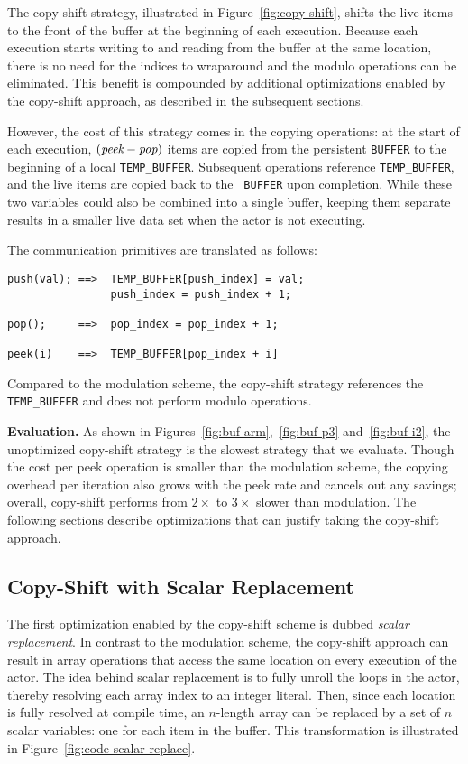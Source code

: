 The copy-shift strategy, illustrated in Figure~\ref{fig:copy-shift},
shifts the live items to the front of the buffer at the beginning of
each execution.  Because each execution starts writing to and reading from
the buffer at the same location, there is no need for the indices to
wraparound and the modulo operations can be eliminated.  This benefit
is compounded by additional optimizations enabled by the copy-shift
approach, as described in the subsequent sections.

However, the cost of this strategy comes in the copying operations: at
the start of each execution, $(\mbox{\it peek} - \mbox{\it pop})$
items are copied from the persistent {\tt BUFFER} to the beginning of
a local {\tt TEMP\_BUFFER}.  Subsequent operations reference
{\tt TEMP\_BUFFER}, and the live items are copied back to the {\tt
BUFFER} upon completion.  While these two variables could also be
combined into a single buffer, keeping them separate results in a
smaller live data set when the actor is not executing.

The communication primitives are translated as follows:

{\scriptsize
\begin{verbatim}
push(val); ==>  TEMP_BUFFER[push_index] = val;
                push_index = push_index + 1;

pop();     ==>  pop_index = pop_index + 1;

peek(i)    ==>  TEMP_BUFFER[pop_index + i]
\end{verbatim}}
\noindent Compared to the modulation scheme, the copy-shift strategy
references the {\tt TEMP\_BUFFER} and does not perform modulo
operations.

{\bf Evaluation.}  As shown in
Figures~\ref{fig:buf-arm},~\ref{fig:buf-p3} and~\ref{fig:buf-i2},
the unoptimized copy-shift strategy is the slowest strategy that we
evaluate.  Though the cost per peek operation is smaller than the
modulation scheme, the copying overhead per iteration also grows with
the peek rate and cancels out any savings; overall, copy-shift
performs from $2\times$ to $3\times$ slower than modulation.  The following sections
describe optimizations that can justify taking the copy-shift
approach.

\subsection{Copy-Shift with Scalar Replacement}
\label{sec:scalar-replacement}

The first optimization enabled by the copy-shift scheme is dubbed {\it
scalar replacement}.  In contrast to the modulation scheme, the
copy-shift approach can result in array operations that access the
same location on every execution of the actor.  The idea behind
scalar replacement is to fully unroll the loops in the actor, thereby
resolving each array index to an integer literal.  Then, since each
location is fully resolved at compile time, an $n$-length array can be
replaced by a set of $n$ scalar variables: one for each item in the
buffer.  This transformation is illustrated in
Figure~\ref{fig:code-scalar-replace}.

